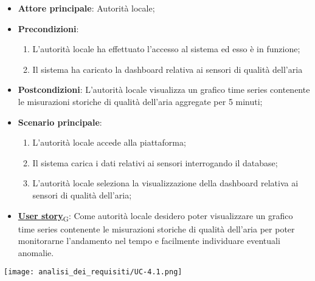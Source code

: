 \begin{itemize}
	\item \textbf{Attore principale}: Autorità locale;
	\item \textbf{Precondizioni}:
	      \begin{enumerate}
		      \item L'autorità locale ha effettuato l'accesso al sistema ed esso è in funzione;
		      \item Il sistema ha caricato la dashboard relativa ai sensori di qualità dell'aria
	      \end{enumerate}
	\item \textbf{Postcondizioni}: L'autorità locale visualizza un grafico time series contenente le misurazioni storiche
	      di qualità dell'aria aggregate per 5 minuti;
	\item \textbf{Scenario principale}:
	      \begin{enumerate}
		      \item L'autorità locale accede alla piattaforma;
		      \item Il sistema carica i dati relativi ai sensori interrogando il database;
		      \item L'autorità locale seleziona la visualizzazione della dashboard relativa ai sensori di qualità dell'aria;
	      \end{enumerate}
	\item \href{https://7last.github.io/docs/rtb/documentazione-interna/glossario\#user-story}{\textbf{User story}\textsubscript{G}}:
	      Come autorità locale desidero poter visualizzare un grafico time series contenente le misurazioni storiche
	      di qualità dell'aria per poter monitorarne l'andamento nel tempo e facilmente individuare eventuali anomalie.
\end{itemize}
\begin{center}
	\texttt{[image: analisi\_dei\_requisiti/UC-4.1.png]}
\end{center}

